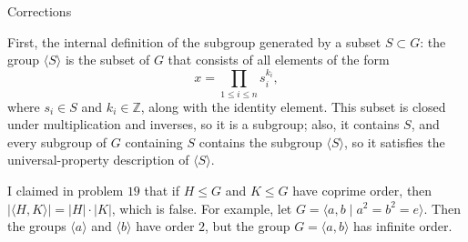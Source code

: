 \documentclass[12pt]{article}
\newcommand{\Z}{\mathbb{Z}}
\theoremstyle{definition}
\begin{document}
\begin{section}{Corrections} 
	\par First, the internal definition of the subgroup generated by a subset $S \subset G$: the group $\langle S\rangle$ is the subset of $G$ that consists of all elements of the form
	\[x = \prod_{1 \leq i \leq n}s_i^{k_i},\]
	where $s_i \in S$ and $k_i \in \Z$, along with the identity element. This subset is closed under multiplication and inverses, so it is a subgroup; also, it contains $S$, and every subgroup of $G$ containing $S$ contains the subgroup $\langle S\rangle$, so it satisfies the universal-property description of $\langle S\rangle$.
	\par I claimed in problem $19$ that if $H \leq G$ and $K \leq G$ have coprime order, then $ \left \lvert {  \langle H, K\rangle } \right \lvert  = \left \lvert {  H } \right \lvert \cdot \left \lvert { K } \right \lvert $, which is false. For example, let $G = \langle a, b \mid a^2 = b^2 = e\rangle$. Then the groups $\langle a\rangle$ and $\langle b\rangle$ have order $2$, but the group $G = \langle a, b\rangle$ has infinite order.
\end{section}
\end{document}
